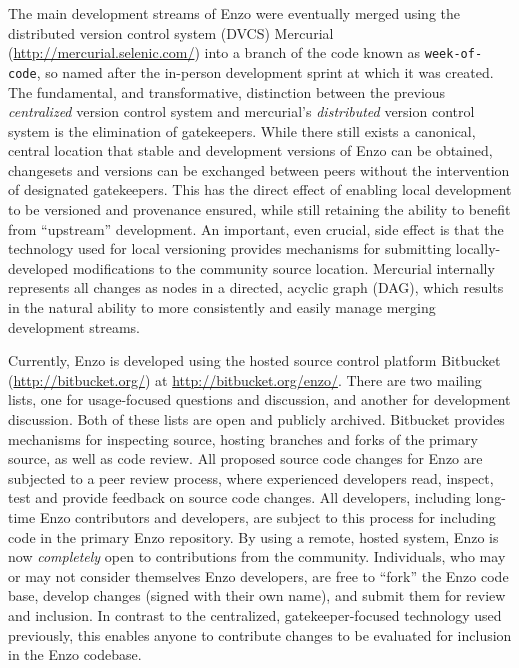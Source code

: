 The main development streams of Enzo were eventually merged using the
distributed version control system (DVCS) Mercurial
(\url{http://mercurial.selenic.com/}) into a branch of the code known as
\texttt{week-of-code}, so named after the in-person development sprint at which
it was created.  The fundamental, and transformative, distinction between the
previous \textit{centralized} version control system and mercurial's
\textit{distributed} version control system is the elimination of gatekeepers.
While there still exists a canonical, central location that stable and
development versions of Enzo can be obtained, changesets and versions can be
exchanged between peers without the intervention of designated gatekeepers.
This has the direct effect of enabling local development to be versioned and
provenance ensured, while still retaining the ability to benefit from
``upstream'' development.  An important, even crucial, side effect is that the
technology used for local versioning provides mechanisms for submitting
locally-developed modifications to the community source location.  Mercurial
internally represents all changes as nodes in a directed, acyclic graph (DAG),
which results in the natural ability to more consistently and easily manage
merging development streams.

Currently, Enzo is developed using the hosted source control platform Bitbucket
(\url{http://bitbucket.org/}) at \url{http://bitbucket.org/enzo/}.  There are
two mailing lists, one for usage-focused questions and discussion, and another
for development discussion.  Both of these lists are open and publicly
archived.  Bitbucket provides mechanisms for inspecting source, hosting
branches and forks of the primary source, as well as code review.  All proposed
source code changes for Enzo are subjected to a peer review process, where
experienced developers read, inspect, test and provide feedback on source code
changes.  All developers, including long-time Enzo contributors and developers,
are subject to this process for including code in the primary Enzo repository.
By using a remote, hosted system, Enzo is now \textit{completely} open to
contributions from the community.  Individuals, who may or may not consider
themselves Enzo developers, are free to ``fork'' the Enzo code base, develop
changes (signed with their own name), and submit them for review and inclusion.
In contrast to the centralized, gatekeeper-focused technology used previously,
this enables anyone to contribute changes to be evaluated for inclusion in the
Enzo codebase.

